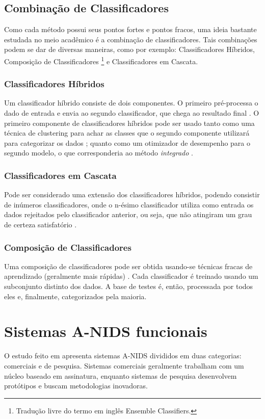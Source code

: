\section{Combinação de Classificadores}
Como cada método possui seus pontos fortes e pontos fracos, uma ideia bastante estudada no meio acadêmico é a
 combinação de classificadores. Tais combinações podem se dar de diversas maneiras, como por exemplo: Classificadores
 Híbridos, Composição de Classificadores \footnote{Tradução livre do termo em inglês Ensemble Classifiers.} e
 Classificadores em Cascata.

 \subsection{Classificadores Híbridos}
    Um classificador híbrido consiste de dois componentes. O primeiro pré-processa o dado de entrada e envia ao segundo
    classificador, que chega ao resultado final \cite{tsai09}. O primeiro componente de classificadores híbridos pode ser usado tanto
    como uma técnica de clustering para achar as classes que o segundo componente utilizará para categorizar os dados \cite{ni07};
    quanto como um otimizador de desempenho para o segundo modelo, o que corresponderia ao método \textit{integrado}
    \cite{aydin09}.


 \subsection{Classificadores em Cascata}
    \label{sec:cascade}
    Pode ser considerado uma extensão dos classificadores híbridos, podendo consistir de inúmeros classificadores, onde
    o n-ésimo classificador utiliza como entrada os dados rejeitados pelo classificador anterior, ou seja, que não
    atingiram um grau de certeza satisfatório \cite{tsai09}.

 \subsection{Composição de Classificadores}
    Uma composição de classificadores pode ser obtida usando-se técnicas fracas de aprendizado
    (geralmente mais rápidas) \cite{tsai09}. Cada classificador é treinado usando um subconjunto distinto dos dados.
    A base de testes é, então, processada por todos eles e, finalmente, categorizados pela maioria.


\chapter{Sistemas A-NIDS funcionais}
    O estudo feito em \cite{teodoro09} apresenta sistemas A-NIDS divididos em duas categorias: comerciais e de pesquisa.
    Sistemas comerciais geralmente trabalham com um núcleo baseado em assinatura, enquanto sistemas de pesquisa
    desenvolvem protótipos e buscam metodologias inovadoras.

